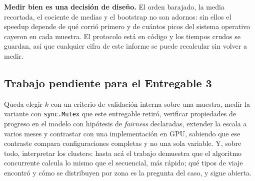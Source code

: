 \textbf{Medir bien es una decisión de diseño.} El orden barajado, la media recortada, el cociente de
medias y el bootstrap no son adornos: sin ellos el speedup depende de qué corrió primero y de cuántos
picos del sistema operativo cayeron en cada muestra. El protocolo está en código y los tiempos crudos
se guardan, así que cualquier cifra de este informe se puede recalcular sin volver a medir.

\subsection{Trabajo pendiente para el Entregable 3}

Queda elegir $k$ con un criterio de validación interna sobre una muestra, medir la variante con
\texttt{sync.Mutex} que este entregable retiró, verificar propiedades de progreso en el modelo con
hipótesis de \emph{fairness} declaradas, extender la escala a varios meses y contrastar con una
implementación en GPU, sabiendo que ese contraste compara configuraciones completas y no una sola
variable. Y, sobre todo, interpretar los clusters: hasta acá el trabajo demuestra que el algoritmo
concurrente calcula lo mismo que el secuencial, más rápido; qué tipos de viaje encontró y cómo se
distribuyen por zona es la pregunta del caso, y sigue abierta.
